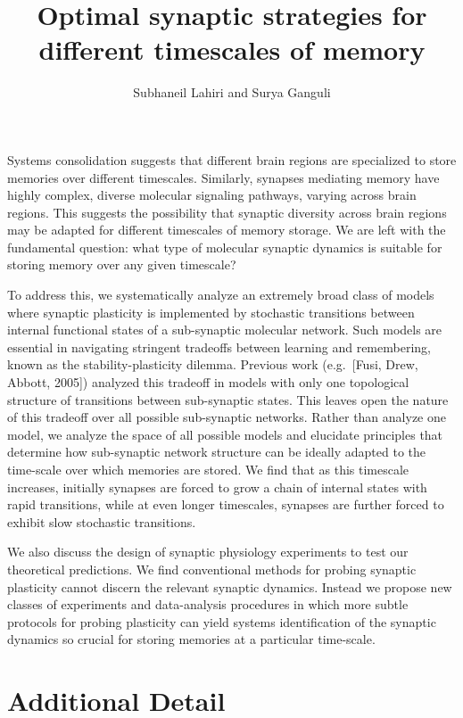 \documentclass[12pt]{article}
\title{Optimal synaptic strategies for different timescales of memory}
\author{Subhaneil Lahiri and Surya Ganguli}
\date{}
\begin{document}
\pagestyle{empty}
\maketitle
\thispagestyle{empty}


Systems consolidation suggests that different brain regions are specialized to store memories over different timescales. Similarly, synapses mediating memory have highly complex, diverse molecular signaling pathways, varying across brain regions. This suggests the possibility that synaptic diversity across brain regions may be adapted for different timescales of memory storage. We are left with the fundamental question: what type of molecular synaptic dynamics is suitable for storing memory over any given timescale?

To address this, we systematically analyze an extremely broad class of models where synaptic plasticity is implemented by stochastic transitions between internal functional states of a sub-synaptic molecular network. Such models are essential in navigating stringent tradeoffs between learning and remembering, known as the stability-plasticity dilemma. Previous work (e.g.\ [Fusi, Drew, Abbott, 2005]) analyzed this tradeoff in models with only one topological structure of transitions between sub-synaptic states.  This leaves open the nature of this tradeoff over all possible sub-synaptic networks.  Rather than analyze one model, we analyze the space of all possible models and elucidate principles that determine how sub-synaptic network structure can be ideally adapted to the time-scale over which memories are stored.  We find that as this timescale increases, initially synapses are forced to grow a chain of internal states with rapid transitions, while at even longer timescales, synapses are further forced to exhibit slow stochastic transitions.

We also discuss the design of synaptic physiology experiments to test our theoretical predictions.  We find conventional methods for probing synaptic plasticity cannot discern the relevant synaptic dynamics.  Instead we propose new classes of experiments and data-analysis procedures in which more subtle protocols for probing plasticity can yield systems identification of the synaptic dynamics so crucial for storing memories at a particular time-scale.

\section*{Additional Detail}
\end{document}
